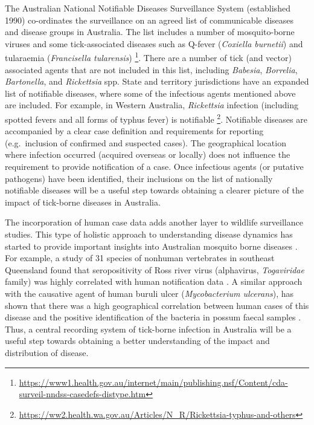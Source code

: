 \documentclass[a4paper, nobind]{templates/ociamthesis}
\begin{document}
The Australian National Notifiable Diseases Surveillance System (established 1990) co-ordinates the surveillance on an agreed list of communicable diseases and disease groups in Australia.
The list includes a number of mosquito-borne viruses and some tick-associated diseases such as Q-fever (\emph{Coxiella burnetii}) and tularaemia (\emph{Francisella tularensis}) \footnote{\url{https://www1.health.gov.au/internet/main/publishing.nsf/Content/cda-surveil-nndss-casedefs-distype.htm}}.
There are a number of tick (and vector) associated agents that are not included in this list, including \emph{Babesia}, \emph{Borrelia}, \emph{Bartonella}, and \emph{Rickettsia} spp.
State and territory jurisdictions have an expanded list of notifiable diseases, where some of the infectious agents mentioned above are included.
For example, in Western Australia, \emph{Rickettsia} infection (including spotted fevers and all forms of typhus fever) is notifiable \footnote{\url{https://ww2.health.wa.gov.au/Articles/N_R/Rickettsia-typhus-and-others}}.
Notifiable diseases are accompanied by a clear case definition and requirements for reporting (e.g.~inclusion of confirmed and suspected cases).
The geographical location where infection occurred (acquired overseas or locally) does not influence the requirement to provide notification of a case.
Once infectious agents (or putative pathogens) have been identified, their inclusions on the list of nationally notifiable diseases will be a useful step towards obtaining a clearer picture of the impact of tick-borne diseases in Australia.

The incorporation of human case data adds another layer to wildlife surveillance studies.
This type of holistic approach to understanding disease dynamics has started to provide important insights into Australian mosquito borne diseases \autocite{ongMosquitoBorneVirusesNonHuman2021}.
For example, a study of 31 species of nonhuman vertebrates in southeast Queensland found that seropositivity of Ross river virus (alphavirus, \emph{Togaviridae} family) was highly correlated with human notification data \autocite{skinnerSpeciesTraitsHotspots2020}.
A similar approach with the causative agent of human buruli ulcer (\emph{Mycobacterium ulcerans}), has shown that there was a high geographical correlation between human cases of this disease and the positive identification of the bacteria in possum faecal samples \autocite{carsonPotentialWildlifeSentinels2014}.
Thus, a central recording system of tick-borne infection in Australia will be a useful step towards obtaining a better understanding of the impact and distribution of disease.
\end{document}
